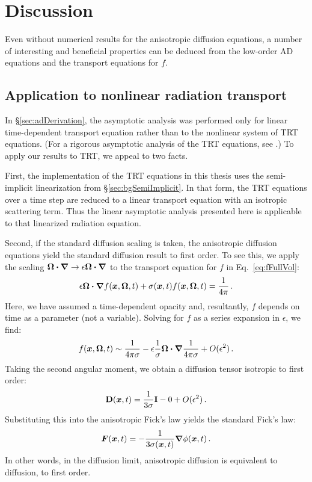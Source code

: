 \section{Discussion}
Even without numerical results for the anisotropic diffusion equations, a
number of interesting and beneficial properties can be deduced from the
low-order AD equations and the transport equations for $f$.

\subsection{Application to nonlinear radiation transport}
\label{sec:appNonlinear}

In \S\ref{sec:adDerivation}, the asymptotic analysis was performed only for
linear time-dependent transport equation rather than to the nonlinear system of
TRT equations. (For a rigorous asymptotic analysis of the TRT equations, see
\cite{Lar1983a}.) To apply our results to TRT, we appeal to two facts.

First, the implementation of the TRT equations in this thesis uses the
semi-implicit linearization from \S\ref{sec:bgSemiImplicit}. In that form, the
TRT equations over a time step are reduced to a linear transport equation with
an isotropic scattering term. Thus the linear asymptotic analysis presented here
is applicable to that linearized radiation equation.

Second, if the standard diffusion scaling is taken, the anisotropic diffusion
equations yield the standard diffusion result to first order. To see this, we
apply the scaling $\bm{\Omega}\bm{\cdot} \bm{\nabla} \to \epsilon \bm{\Omega}\bm{\cdot} \bm{\nabla}$ to
the transport equation for $f$ in Eq.~\eqref{eq:fFullVol}:
\begin{equation*}
  \epsilon \bm{\Omega}\bm{\cdot} \bm{\nabla} f(\bm{x}, \bm{\Omega}, t)
  + \sigma(\bm{x},t) f(\bm{x}, \bm{\Omega}, t)
  = \frac{1}{4\pi}\,.
\end{equation*}
Here, we have assumed a time-dependent opacity and, resultantly, $f$ depends on
time as a parameter (not a variable). Solving for $f$ as a series expansion in
$\epsilon$, we find:
\begin{align*}
  f(\bm{x}, \bm{\Omega}, t)
  \sim
  \frac{1}{4\pi \sigma}
  - \epsilon 
  \frac{1}{\sigma} \bm{\Omega}\bm{\cdot} \bm{\nabla} \frac{1}{4\pi \sigma}
  + O( \epsilon^2)\,.
\end{align*}
Taking the second angular moment, we obtain a diffusion tensor isotropic to
first order:
\begin{equation*}
  \mathbf{D}(\bm{x}, t)
  =
  \frac{1}{3 \sigma} \mathbf{I}
  - 0
  + O( \epsilon^2)\,.
\end{equation*}
Substituting this into the anisotropic Fick's law yields the standard Fick's
law:
\begin{equation*}
  \bm{F}(\bm{x},t) = - \frac{1}{3 \sigma(\bm{x},t)} \bm{\nabla} \phi(\bm{x},t)\,.
\end{equation*}
In other words, in the diffusion limit, anisotropic diffusion is equivalent to
diffusion, to first order.

